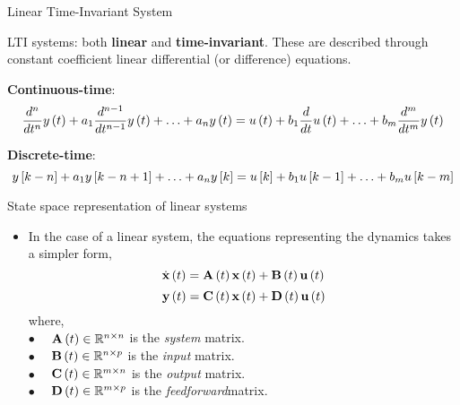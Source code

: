 \documentclass[aspectratio=169]{beamer}
\let\olditem\item
\renewcommand{\item}{\setlength{\itemsep}{\fill}\olditem}
\def\mf{\ensuremath\mathbf}
\def\mb{\ensuremath\mathbb}
\def\lp{\ensuremath\left(}
\def\rp{\ensuremath\right)}
\def\lc{\ensuremath\left\{}
\def\rc{\ensuremath\right\}}
\def\ls{\ensuremath\left[}
\def\rs{\ensuremath\right]}
\newcommand{\ct}[1]{\lp #1\rp}
\begin{document}
\begin{frame}{Linear Time-Invariant System}
    \vspace{-0.5cm}
\begin{center}
\end{center}

LTI systems: both \textbf{linear} and \textbf{time-invariant}. These are described through constant coefficient linear differential (or difference) equations.


\textbf{Continuous-time}: 
$$\frac{d^n}{dt^n}y\lp t\rp + a_{1}\frac{d^{n-1}}{dt^{n-1}}y\lp t\rp + \ldots + a_ny\lp t\rp = u\lp t\rp + b_1\frac{d}{dt}u\lp t\rp + \ldots + b_m\frac{d^m}{dt^m}y\lp t\rp $$


\textbf{Discrete-time}:
$$y\ls k - n\rs + a_1y\ls k - n + 1\rs + \ldots + a_ny\ls k\rs = u\ls k\rs + b_1u\ls k-1\rs + \ldots + b_m u\ls k-m\rs$$
\end{frame}


\begin{frame}[t]{State space representation of linear systems}
    \begin{itemize}
        \item In the case of a linear system, the equations representing the dynamics takes a simpler form,
        \[ \dot{\mf{x}}\ct{t} = \mf{A}\ct{t}\mf{x}\ct{t} + \mf{B}\ct{t}\mf{u}\ct{t} \]
        \[ \mf{y}\ct{t} = \mf{C}\ct{t}\mf{x}\ct{t} + \mf{D}\ct{t}\mf{u}\ct{t} \]
        where,\\
        $\bullet \quad $ $\mf{A}\ct{t} \in \mb{R}^{n \times n}$ is the \textit{system} matrix.\\
        $\bullet \quad $ $\mf{B}\ct{t} \in \mb{R}^{n \times p}$ is the \textit{input} matrix.\\
        $\bullet \quad $ $\mf{C}\ct{t} \in \mb{R}^{m \times n}$ is the \textit{output} matrix.\\
        $\bullet \quad $ $\mf{D}\ct{t} \in \mb{R}^{m \times p}$ is the \textit{feedforward}matrix.
    \end{itemize}
\end{frame}
    
\end{document}
